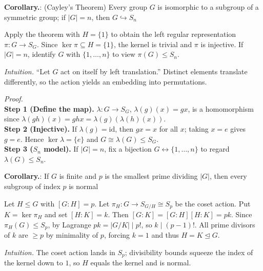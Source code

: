\documentclass[12pt]{article}
\theoremstyle{definition}
\begin{document}
\noindent\textbf{Corollary.}: (Cayley’s Theorem) Every group $G$ is isomorphic to a subgroup of a symmetric group; if $|G|=n$, then $G\hookrightarrow S_n$

\newpage

Apply the theorem with $H=\{1\}$ to obtain the left regular representation $\pi:G\to S_G$. Since $\ker\pi\subseteq H=\{1\}$, the kernel is trivial and $\pi$ is injective. If $|G|=n$, identify $G$ with $\{1,\dots,n\}$ to view $\pi(G)\le S_n$.\\

\dotfill

\emph{Intuition.} “Let $G$ act on itself by left translation.” Distinct elements translate differently, so the action yields an embedding into permutations.

\dotfill

\emph{Proof.}\\
\textbf{Step 1 (Define the map).} $\lambda:G\to S_G$, $\lambda(g)(x)=gx$, is a homomorphism since $\lambda(gh)(x)=ghx=\lambda(g)(\lambda(h)(x))$.\\
\textbf{Step 2 (Injective).} If $\lambda(g)=\mathrm{id}$, then $gx=x$ for all $x$; taking $x=e$ gives $g=e$. Hence $\ker\lambda=\{e\}$ and $G\cong \lambda(G)\le S_G$.\\
\textbf{Step 3 ($S_n$ model).} If $|G|=n$, fix a bijection $G\!\leftrightarrow\!\{1,\dots,n\}$ to regard $\lambda(G)\le S_n$.\\

\newpage


\noindent\textbf{Corollary.}: If $G$ is finite and $p$ is the smallest prime dividing $|G|$, then every subgroup of index $p$ is normal

\newpage

Let $H\le G$ with $[G:H]=p$. Let $\pi_H:G\to S_{G/H}\cong S_p$ be the coset action. Put $K=\ker\pi_H$ and set $[H:K]=k$. Then $[G:K]=[G:H][H:K]=pk$. Since $\pi_H(G)\le S_p$, by Lagrange $pk=|G/K|\mid p!$, so $k\mid(p-1)!$. All prime divisors of $k$ are $\ge p$ by minimality of $p$, forcing $k=1$ and thus $H=K\trianglelefteq G$.\\

\dotfill

\emph{Intuition.} The coset action lands in $S_p$; divisibility bounds squeeze the index of the kernel down to $1$, so $H$ equals the kernel and is normal.

\dotfill
\end{document}
